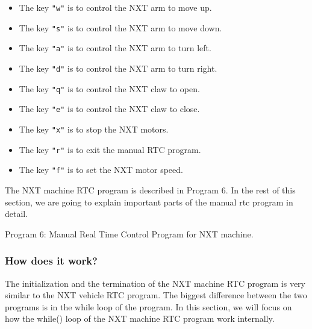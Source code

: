 \documentclass[12pt]{article}
\begin{document}
\begin{itemize}
\item The key \verb+"w"+ is to control the NXT arm to move up.
\item The key \verb+"s"+ is to control the NXT arm to move down.
\item The key \verb+"a"+ is to control the NXT arm to turn left.
\item The key \verb+"d"+ is to control the NXT arm to turn right.
\item The key \verb+"q"+ is to control the NXT claw to open.
\item The key \verb+"e"+ is to control the NXT claw to close.
\item The key \verb+"x"+ is to stop the NXT motors.
\item The key \verb+"r"+ is to exit the manual RTC program.
\item The key \verb+"f"+ is to set the NXT motor speed.
\end{itemize}
The NXT machine RTC program is described in Program 6.
In the rest of this section, we are going to explain important parts of the manual rtc program in detail.

\begin{center}
Program 6: Manual Real Time Control Program for NXT machine.
\end{center}
\subsubsection*{How does it work?}
The initialization and the termination of the NXT machine RTC program is very similar to the
   NXT vehicle RTC program.
The biggest difference between the two programs is in the while loop of the program.
In this section, we will focus on how the while() loop of the NXT machine RTC program work internally.
\end{document}
